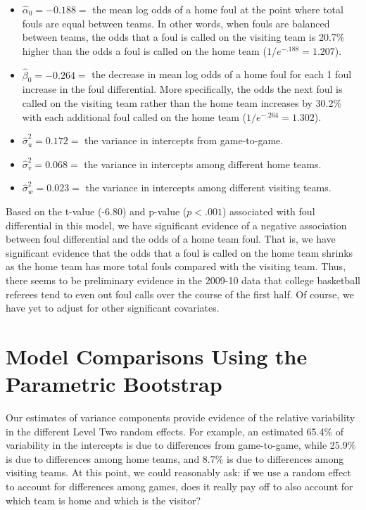 \documentclass[
]{krantz}
\providecommand{\tightlist}{%
  \setlength{\itemsep}{0pt}\setlength{\parskip}{0pt}}
\begin{document}
\begin{itemize}
\tightlist
\item
  \(\hat{\alpha}_{0}=-0.188=\) the mean log odds of a home foul at the point where total fouls are equal between teams. In other words, when fouls are balanced between teams, the odds that a foul is called on the visiting team is 20.7\% higher than the odds a foul is called on the home team (\(1/e^{-.188}=1.207\)).
\item
  \(\hat{\beta}_{0}=-0.264=\) the decrease in mean log odds of a home foul for each 1 foul increase in the foul differential. More specifically, the odds the next foul is called on the visiting team rather than the home team increases by 30.2\% with each additional foul called on the home team (\(1/e^{-.264}=1.302\)).
\item
  \(\hat{\sigma}_{u}^{2}=0.172=\) the variance in intercepts from game-to-game.
\item
  \(\hat{\sigma}_{v}^{2}=0.068=\) the variance in intercepts among different home teams.
\item
  \(\hat{\sigma}_{w}^{2}=0.023=\) the variance in intercepts among different visiting teams.
\end{itemize}

Based on the t-value (-6.80) and p-value (\(p<.001\)) associated with foul differential in this model, we have significant evidence of a negative association between foul differential and the odds of a home team foul. That is, we have significant evidence that the odds that a foul is called on the home team shrinks as the home team has more total fouls compared with the visiting team. Thus, there seems to be preliminary evidence in the 2009-10 data that college basketball referees tend to even out foul calls over the course of the first half. Of course, we have yet to adjust for other significant covariates.

\hypertarget{glmm-paraboot}{%
\section{Model Comparisons Using the Parametric Bootstrap}\label{glmm-paraboot}}

Our estimates of variance components provide evidence of the relative variability in the different Level Two random effects. For example, an estimated 65.4\% of variability in the intercepts is due to differences from game-to-game, while 25.9\% is due to differences among home teams, and 8.7\% is due to differences among visiting teams. At this point, we could reasonably ask: if we use a random effect to account for differences among games, does it really pay off to also account for which team is home and which is the visitor?
\end{document}
